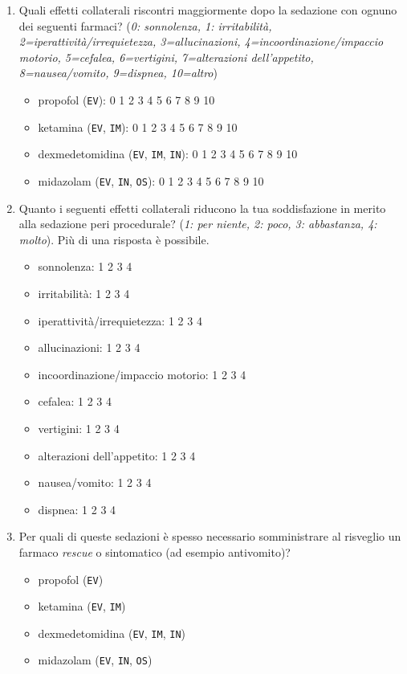 \begin{enumerate}
           \item Quali effetti collaterali riscontri maggiormente dopo la sedazione con ognuno dei seguenti farmaci? (\emph{0: sonnolenza, 1: irritabilità, 2=iperattività/irrequietezza, 3=allucinazioni, 4=incoordinazione/impaccio motorio, 5=cefalea, 6=vertigini, 7=alterazioni dell’appetito, 8=nausea/vomito, 9=dispnea, 10=altro})
           \begin{itemize}
               \item propofol (\texttt{EV}): 0 1 2 3 4 5 6 7 8 9 10
               \item ketamina (\texttt{EV}, \texttt{IM}): 0 1 2 3 4 5 6 7 8 9 10
               \item dexmedetomidina (\texttt{EV}, \texttt{IM}, \texttt{IN}): 0 1 2 3 4 5 6 7 8 9 10
               \item midazolam (\texttt{EV}, \texttt{IN}, \texttt{OS}): 0 1 2 3 4 5 6 7 8 9 10
           \end{itemize}
           
           \item Quanto i seguenti effetti collaterali riducono la tua soddisfazione in merito alla sedazione peri procedurale? (\emph{1: per niente, 2: poco, 3: abbastanza, 4: molto}). Più di una risposta è possibile. 
           \begin{itemize}
               \item sonnolenza:     1 2 3 4
               \item irritabilità:   1 2 3 4
               \item iperattività/irrequietezza: 1 2 3 4
               \item allucinazioni: 1 2 3 4
               \item incoordinazione/impaccio motorio: 1 2 3 4
               \item cefalea: 1 2 3 4
               \item vertigini: 1 2 3 4
               \item alterazioni dell’appetito: 1 2 3 4
               \item nausea/vomito: 1 2 3 4
               \item dispnea: 1 2 3 4
           \end{itemize}
           
           \item Per quali di queste sedazioni è spesso necessario somministrare al risveglio un farmaco \emph{rescue} o sintomatico (ad esempio antivomito)?
           \begin{itemize}
               \item propofol (\texttt{EV})
               \item ketamina (\texttt{EV}, \texttt{IM})
               \item dexmedetomidina (\texttt{EV}, \texttt{IM}, \texttt{IN})
               \item midazolam (\texttt{EV}, \texttt{IN}, \texttt{OS})
           \end{itemize}
           

\end{enumerate}
